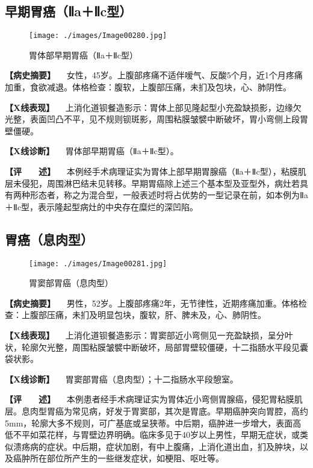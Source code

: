 \subsection{早期胃癌（Ⅱa＋Ⅱc型）}

\begin{figure}[!htbp]
 \centering
 \texttt{[image: ./images/Image00280.jpg]}
 \captionsetup{justification=centering}
 \caption{胃体部早期胃癌（Ⅱa＋Ⅱc型）}
 \label{fig5-3-18}
  \end{figure} 

\textbf{【病史摘要】}
　女性，45岁。上腹部疼痛不适伴嗳气、反酸5个月，近1个月疼痛加重，食欲减退。体格检查：腹软，上腹部压痛，未扪及包块，心、肺阴性。

\textbf{【X线表现】}
　上消化道钡餐造影示：胃体上部见隆起型小充盈缺损影，边缘欠光整，表面凹凸不平，见不规则钡斑影，周围粘膜皱襞中断破坏，胃小弯侧上段胃壁僵硬。

\textbf{【X线诊断】} 　胃体部早期胃癌（Ⅱa＋Ⅱc型）。

\textbf{【评　　述】}
　本例经手术病理证实为胃体上部早期胃腺癌（Ⅱa＋Ⅱc型），粘膜肌层未侵犯，周围淋巴结未见转移。早期胃癌除上述三个基本型及亚型外，病灶若具有两种形态者，称之为混合型，一般表述时将占优势的一型记录在前，如本例为Ⅱa＋Ⅱc型，表示隆起型病灶的中央存在糜烂的深凹陷。

\subsection{胃癌（息肉型）}

\begin{figure}[!htbp]
 \centering
 \texttt{[image: ./images/Image00281.jpg]}
 \captionsetup{justification=centering}
 \caption{胃窦部胃癌（息肉型）}
 \label{fig5-3-19}
  \end{figure} 

\textbf{【病史摘要】}
　男性，52岁。上腹部疼痛2年，无节律性，近期疼痛加重。体格检查：上腹部压痛，未扪及明显包块，腹软，肝、脾未及，心、肺阴性。

\textbf{【X线表现】}
　上消化道钡餐造影示：胃窦部近小弯侧见一充盈缺损，呈分叶状，轮廓欠光整，周围粘膜皱襞中断破坏，局部胃壁较僵硬，十二指肠水平段见囊袋状影。

\textbf{【X线诊断】} 　胃窦部胃癌（息肉型）；十二指肠水平段憩室。

\textbf{【评　　述】}
　本例患者经手术病理证实为胃体近小弯侧胃腺癌，侵犯胃粘膜肌层。息肉型胃癌为常见病，好发于胃窦部，其次是胃底。早期癌肿突向胃腔，高约5mm，轮廓大多不规则，可广基底或呈狭蒂。中后期，癌肿进一步增大，表面高低不平如菜花样，与胃壁边界明确。临床多见于40岁以上男性，早期无症状，或类似溃疡病的症状。中后期，症状加剧，有中上腹痛，上消化道出血，扪及肿块，以及癌肿所在部位所产生的一些继发症状，如梗阻、呕吐等。

